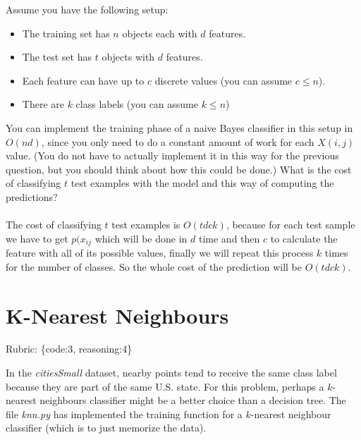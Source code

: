 \documentclass{article}
\def\rubric#1{\gre{Rubric: \{#1\}}}{}
\def\blu#1{{\color{blu}#1}}
\def\gre#1{{\color{gre}#1}}
\def\ans#1{{\color{ans}#1}}
\def\items#1{\begin{itemize}#1\end{itemize}}
\begin{document}
Assume you have the following setup:
\items{
\item The training set has $n$ objects each with $d$ features.
\item The test set has $t$ objects with $d$ features.
\item Each feature can have up to $c$ discrete values (you can assume $c \leq n$).
\item There are $k$ class labels (you can assume $k \leq n$)
}
You can implement the training phase of a naive Bayes classifier in this setup in $O(nd)$, since you only need to do a constant amount of work for each $X(i,j)$ value. (You do not have to actually implement it in this way for the previous question, but you should think about how this could be done.)
 \blu{What is the cost of classifying $t$ test examples with the model and this way of computing the predictions?} \\ \\
\ans{
   The cost of classifying $t$ test examples is $O(tdck)$, because for each test sample we have to get
   $p(x_{ij}$ which will be done in $d$ time and then $c$ to calculate the feature with all of its 
   possible values, finally we will repeat this process $k$ times for the number of classes. 
   So the whole cost of the prediction will be $O(tdck)$.
}

\section{K-Nearest Neighbours}
\rubric{code:3, reasoning:4}

In the \emph{citiesSmall} dataset, nearby points tend to receive the same class label because they are part of the same U.S. state. For this problem, perhaps a $k$-nearest neighbours classifier might be a better choice than a decision tree. The file \emph{knn.py} has implemented the training function for a $k$-nearest neighbour classifier (which is to just memorize the data).
\end{document}
